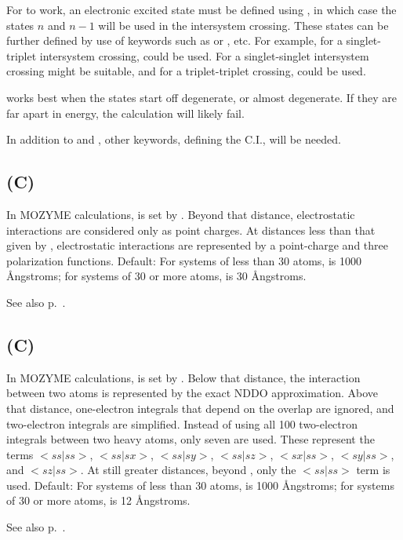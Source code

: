 For  to work, an electronic  excited state must be defined using
, in which case the states $n$ and $n-1$ will be used in the
intersystem crossing.  These states can be further defined by use of keywords
such as  or , etc.  For example, for a singlet-triplet
intersystem  crossing,  could be used.  For a singlet-singlet
intersystem crossing  might be suitable, and for a
triplet-triplet crossing,  could be used.

 works best when the states start off degenerate, or almost degenerate.
If they are far apart in energy, the calculation will likely fail.

In addition to  and , other keywords, defining the C.I.,
will be needed.


\subsection*{ (C)}

In MOZYME calculations,  is set by .  Beyond that
distance, electrostatic interactions are considered only as point
charges. At distances less than that given by ,
electrostatic interactions are represented by a point-charge and three
polarization functions.  Default: For systems of less than 30 atoms,
 is 1000 \AA ngstroms; for systems of 30 or more atoms,
 is 30 \AA ngstroms.
\begin{latexonly}
See also p.~\pageref{cutof1}.
\end{latexonly}

\subsection*{ (C)}
In MOZYME calculations,  is set by
.  Below that distance, the interaction between two
atoms is represented by the exact NDDO approximation.  Above that
distance, one-electron integrals that depend on the overlap are
ignored, and two-electron integrals are simplified.  Instead of using
all 100 two-electron integrals between two heavy atoms, only seven are
used.  These represent the terms $<\!ss|ss\!>$, $<\!ss|sx\!>$,
$<\!ss|sy\!>$, $<\!ss|sz\!>$, $<\!sx|ss\!>$, $<\!sy|ss\!>$, and
$<\!sz|ss\!>$. At still greater distances, beyond , only
the $<\!ss|ss\!>$ term is used.  Default: For systems of less than 30
atoms,  is 1000 \AA ngstroms; for systems of 30 or more
atoms,  is 12 \AA ngstroms.
\begin{latexonly}
See also p.~\pageref{cutof2}.
\end{latexonly}

